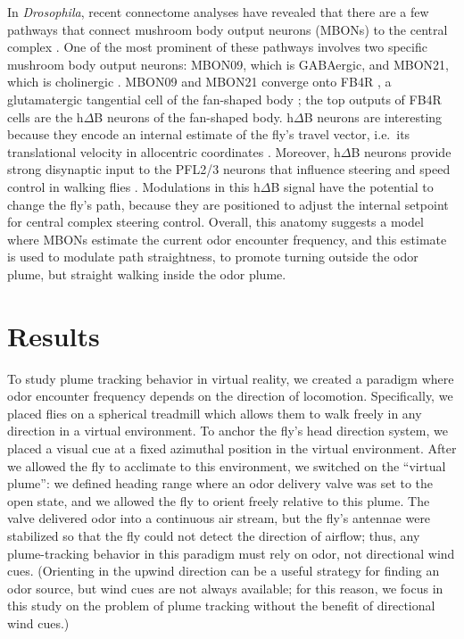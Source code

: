 In \textit{Drosophila}, recent connectome analyses have revealed that there are a few pathways that connect mushroom body output neurons (MBONs) to the central complex \citep{li2020, hulse2021}. %
One of the most prominent of these pathways involves two specific mushroom body output neurons: MBON09, which is GABAergic, and MBON21, which is cholinergic \citep{aso2014}. %
MBON09 and MBON21 converge onto FB4R \citep{li2020, hulse2021}, %
a glutamatergic tangential cell of the fan-shaped body \citep{wolff2025}; %
the top outputs of FB4R cells are the h$\Delta$B neurons of the fan-shaped body. h$\Delta$B neurons are interesting because they encode an internal estimate of the fly's travel vector, i.e.\ its translational velocity in allocentric coordinates \citep{lu2021, lyu2021}. %
Moreover, h$\Delta$B neurons provide strong disynaptic input to the PFL2/3 neurons that influence steering and speed control in walking flies \citep{westeinde2024, musselspires2024}. %
Modulations in this h$\Delta$B signal have the potential to change the fly's path, because they are positioned to adjust the internal setpoint for central complex steering control. Overall, this anatomy suggests a model where MBONs estimate the current odor encounter frequency, and this estimate is used to modulate path straightness, to promote turning outside the odor plume, but straight walking inside the odor plume.

\section{Results}

To study plume tracking behavior in virtual reality, we created a paradigm where odor encounter frequency depends on the direction of locomotion. Specifically, we placed flies on a spherical treadmill which allows them to walk freely in any direction in a virtual environment. To anchor the fly’s head direction system, we placed a visual cue at a fixed azimuthal position in the virtual environment. After we allowed the fly to acclimate to this environment, we switched on the ``virtual plume'': we defined heading range where an odor delivery valve was set to the open state, and we allowed the fly to orient freely relative to this plume. The valve delivered odor into a continuous air stream, but the fly’s antennae were stabilized so that the fly could not detect the direction of airflow; thus, any plume-tracking behavior in this paradigm must rely on odor, not directional wind cues. (Orienting in the upwind direction can be a useful strategy for finding an odor source, but wind cues are not always available; for this reason, we focus in this study on the problem of plume tracking without the benefit of directional wind cues.) 

